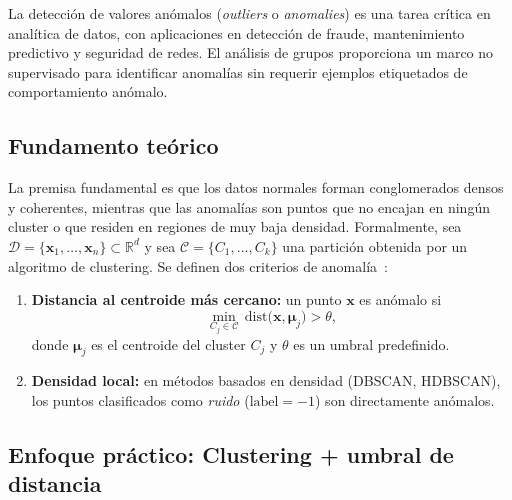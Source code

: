 
La detección de valores anómalos (\emph{outliers} o \emph{anomalies}) es una tarea crítica en analítica de datos, con aplicaciones en detección de fraude, mantenimiento predictivo y seguridad de redes. El análisis de grupos proporciona un marco no supervisado para identificar anomalías sin requerir ejemplos etiquetados de comportamiento anómalo.

\subsection{Fundamento teórico}

La premisa fundamental es que los datos normales forman conglomerados densos y coherentes, mientras que las anomalías son puntos que no encajan en ningún cluster o que residen en regiones de muy baja densidad. Formalmente, sea $\mathcal{D} = \{ \mathbf{x}_1, \dots, \mathbf{x}_n \} \subset \mathbb{R}^d$ y sea $\mathcal{C} = \{ C_1, \dots, C_k \}$ una partición obtenida por un algoritmo de clustering. Se definen dos criterios de anomalía~\cite{chandola2009anomaly}:

\begin{enumerate}[label=\arabic*.]
    \item \textbf{Distancia al centroide más cercano:} un punto $\mathbf{x}$ es anómalo si
    \begin{equation}
        \min_{C_j \in \mathcal{C}} \, \mathrm{dist}\bigl(\mathbf{x}, \boldsymbol{\mu}_j\bigr) > \theta,
    \end{equation}
    donde $\boldsymbol{\mu}_j$ es el centroide del cluster $C_j$ y $\theta$ es un umbral predefinido.

    \item \textbf{Densidad local:} en métodos basados en densidad (DBSCAN, HDBSCAN), los puntos clasificados como \emph{ruido} ($\mathrm{label} = -1$) son directamente anómalos.
\end{enumerate}

\subsection{Enfoque práctico: Clustering + umbral de distancia}

